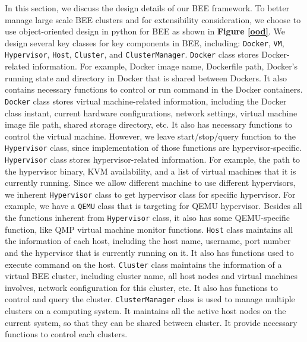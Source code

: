In this section, we discuss the design details of our BEE framework. To better manage large scale BEE clusters and for extensibility consideration, we choose to use object-oriented design in python for BEE as shown in \textbf{Figure \ref{ood}}. We design several key classes for key components in BEE, including: \texttt{Docker}, \texttt{VM}, \texttt{Hypervisor}, \texttt{Host}, \texttt{Cluster}, and \texttt{ClusterManager}. \texttt{Docker} class stores Docker-related information. For example, Docker image name, Dockerfile path, Docker's running state and directory in Docker that is shared between Dockers. It also contains necessary functions to control or run command in the Docker containers. \texttt{Docker} class stores virtual machine-related information, including the Docker class instant, current hardware configurations, network settings, virtual machine image file path, shared storage directory, etc. It also has necessary functions to control the virtual machine. However, we leave start/stop/query function to the \texttt{Hypervisor} class, since implementation of those functions are hypervisor-specific. \texttt{Hypervisor} class stores hypervisor-related information. For example, the path to the hypervisor binary, KVM availability, and a list of virtual machines that it is currently running. Since we allow different machine to use different hypervisors, we inherent \texttt{Hypervisor} class to get hypervisor class for specific hypervisor. For example, we have a \texttt{QEMU} class that is targeting for QEMU hypervisor. Besides all the functions inherent from \texttt{Hypervisor} class, it also has some QEMU-specific function, like QMP virtual machine monitor functions. \texttt{Host} class maintains all the information of each host, including the host name, username, port number and the hypervisor that is currently running on it. It also has functions used to execute command on the host. \texttt{Cluster} class maintains the information of a virtual BEE cluster, including cluster name,  all host nodes and virtual machines involves, network configuration for this cluster, etc. It also has functions to control and query the cluster. \texttt{ClusterManager} class is used to manage multiple clusters on a computing system. It maintains all the active host nodes on the current system, so that they can be shared between cluster. It provide necessary functions to control each clusters. 

